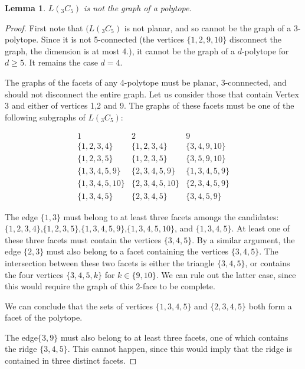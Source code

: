 \documentclass[a4paper,12pt]{article}
\newtheorem{lemma}{Lemma}
\begin{document}
  \begin{lemma}
    \(L(_3C_5)\) is not the graph of a polytope.
  \end{lemma}

  \begin{proof}

  First note that \((L(_3C_5)\) is not planar, and so cannot be the graph of a 3-polytope. Since it is not 5-connected (the  vertices \(\{1,2,9,10\}\) disconnect the graph, the  dimension is at most 4.), it cannot be the graph of a \(d\)-polytope for \(d\geq 5\). It remains the case \(d=4\).

  The graphs of the facets of any 4-polytope must be planar, 3-connnected, and should not disconnect the entire graph. Let us consider those that contain Vertex \(3\) and either of vertices  1,2 and 9. The graphs of these facets must be one of the following subgraphs of \(L(_3C_5)\):

  \[
  \begin{array}{ccc}
    1 & 2 & 9\\
    \{1,2,3,4\} & \{1,2,3,4\} & \{3,4,9,10\}  \\
    \{1,2,3,5\} & \{1,2,3,5\} & \{3,5,9,10\}  \\
    \{1,3,4,5,9\} & \{2,3,4,5,9\} & \{1,3,4,5,9\}  \\
    \{1,3,4,5,10\} & \{2,3,4,5,10\} & \{2,3,4,5,9\}  \\
    \{1,3,4,5\} & \{2,3,4,5\} & \{3,4,5,9\} 
  \end{array}
  \]

  The edge \(\{1,3\}\) must belong to at least three facets amongs the candidates: \(\{1,2,3,4\}\),\(\{1,2,3,5\}\),\(\{1,3,4,5,9\}\),\(\{1,3,4,5,10\}\), and \(\{1,3,4,5\}\). At least one of these three facets must contain the  vertices  \(\{3,4,5\}\). By a similar argument, the edge \(\{2,3\}\) must also belong to  a facet containing the vertices \(\{3,4,5\}\). The intersection between these two facets is either the triangle \(\{3,4,5\}\), or contains the four vertices \(\{3,4,5,k\}\) for \(k\in \{9,10\}\). We can rule out the latter case, since this would require the graph of this 2-face to be complete.

  We can conclude that the sets of vertices \(\{1,3,4,5\}\) and \(\{2,3,4,5\}\) both form a facet of the polytope.


  The edge\(\{3,9\}\) must also belong to at least three facets, one of which contains the ridge \(\{3,4,5\}\). This cannot happen, since this would imply  that the ridge  is contained in three distinct facets.

  \end{proof}
\end{document}

